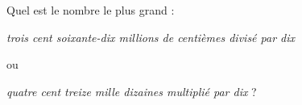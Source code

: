 Quel est le nombre le plus grand :
\begin{center}
\textit{trois cent soixante-dix millions de centièmes divisé par dix}
\par ou
\par \textit{quatre cent treize mille dizaines multiplié par dix} ?
\end{center}